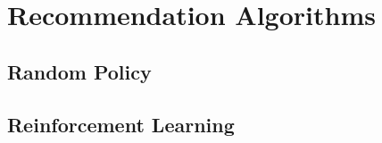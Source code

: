 
\chapter{Recommendation Algorithms}

\section{Random Policy}

\section{Reinforcement Learning}











